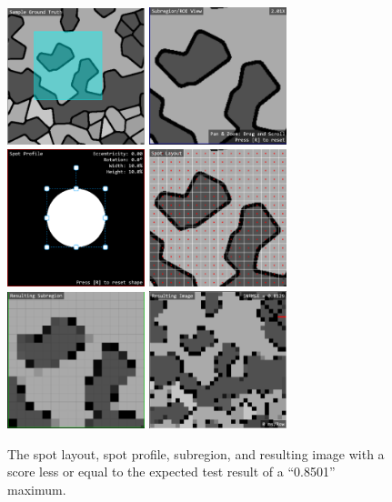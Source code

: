 \documentclass[12pt, titlepage]{article}
\begin{document}
\begin{figure}[h!]
  \begin{center}
   \includegraphics[width=4cm]{t10a.png}
   \includegraphics[width=4cm]{t10b.png}
   \includegraphics[width=4cm]{t11c.png}
   \includegraphics[width=4cm]{t11d.png}
   \includegraphics[width=4cm]{t11e.png}
   \includegraphics[width=4cm]{t11f.png}
  \caption{The spot layout, spot profile, subregion, and resulting image with a score less or equal to
  the expected test result of a ``0.8501'' maximum.}
  \label{fig_t11} 
  \end{center}
\end{figure}
\end{document}
